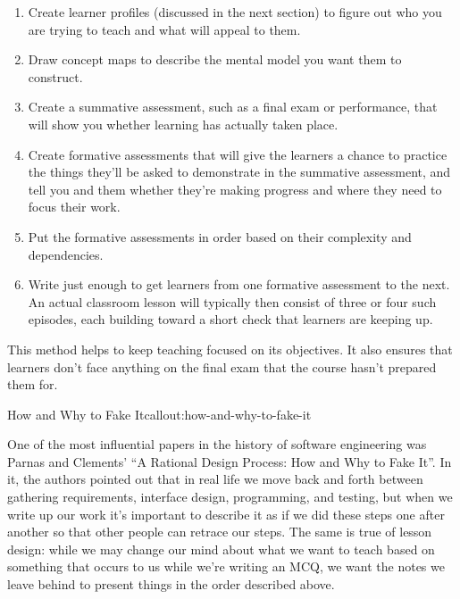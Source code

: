 \begin{enumerate}

\item
  Create learner profiles (discussed in the next section) to figure
  out who you are trying to teach and what will appeal to them.

\item
  Draw concept maps to describe the mental model you want them to
  construct.

\item
  Create a summative assessment, such as a final exam or performance,
  that will show you whether learning has actually taken place.

\item
  Create formative assessments that will give the learners a chance to
  practice the things they'll be asked to demonstrate in the summative
  assessment, and tell you and them whether they're making progress
  and where they need to focus their work.

\item
  Put the formative assessments in order based on their complexity and
  dependencies.

\item
  Write just enough to get learners from one formative assessment to
  the next.  An actual classroom lesson will typically then consist of
  three or four such episodes, each building toward a short check that
  learners are keeping up.

\end{enumerate}

This method helps to keep teaching focused on its objectives. It also
ensures that learners don't face anything on the final exam that the
course hasn't prepared them for.

\begin{callout}{How and Why to Fake It}{callout:how-and-why-to-fake-it}

One of the most influential papers in the history of software
engineering was Parnas and Clements' ``A Rational Design Process: How
and Why to Fake It''.  In it, the authors pointed out that in real
life we move back and forth between gathering requirements, interface
design, programming, and testing, but when we write up our work it's
important to describe it as if we did these steps one after another so
that other people can retrace our steps. The same is true of lesson
design: while we may change our mind about what we want to teach based
on something that occurs to us while we're writing an MCQ, we want the
notes we leave behind to present things in the order described above.

\end{callout}

